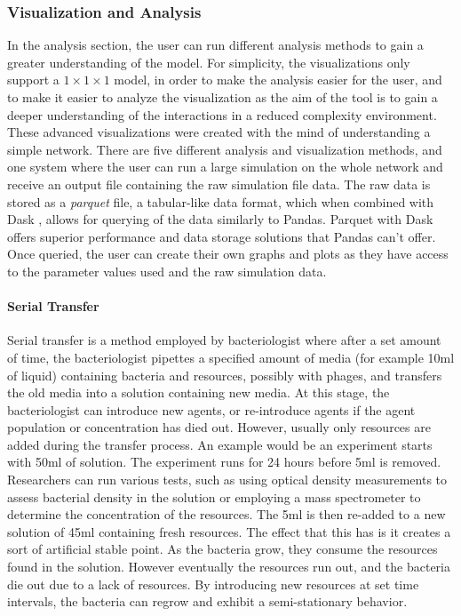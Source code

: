 \subsubsection{Visualization and Analysis}
In the analysis section, the user can run different analysis methods to gain a greater understanding of the model.
For simplicity, the visualizations only support a $1 \times 1\times 1$ model, in order to make the analysis easier for the user, and to make it easier to analyze the visualization as the aim of the tool is to gain a deeper understanding of the interactions in a reduced complexity environment. 
These advanced visualizations were created with the mind of understanding a simple network.
There are five different analysis and visualization methods, and one system where the user can run a large simulation on the whole network and receive an output file containing the raw simulation file data.
The raw data is stored as a \textit{parquet} file, a tabular-like data format, which when combined with Dask \cite{DaskDaskDocumentation}, allows for querying of the data similarly to Pandas.
Parquet with Dask offers superior performance and data storage solutions that Pandas can't offer.
Once queried, the user can create their own graphs and plots as they have access to the parameter values used and the raw simulation data.

\paragraph{Serial Transfer}
\label{sec:serial_transfer}
Serial transfer is a method employed by bacteriologist where after a set amount of time, the bacteriologist pipettes a specified amount of media (for example 10ml of liquid) containing bacteria and resources, possibly with phages, and transfers the old media into a solution containing new media.
At this stage, the bacteriologist can introduce new agents, or re-introduce agents if the agent population or concentration has died out.
However, usually only resources are added during the transfer process.
An example would be an experiment starts with 50ml of solution.
The experiment runs for 24 hours before 5ml is removed.
Researchers can run various tests, such as using optical density measurements to assess bacterial density in the solution or employing a mass spectrometer to determine the concentration of the resources.
The 5ml is then re-added to a new solution of 45ml containing fresh resources.
The effect that this has is it creates a sort of artificial stable point.
As the bacteria grow, they consume the resources found in the solution.
However eventually the resources run out, and the bacteria die out due to a lack of resources.
By introducing new resources at set time intervals, the bacteria can regrow and exhibit a semi-stationary behavior.

